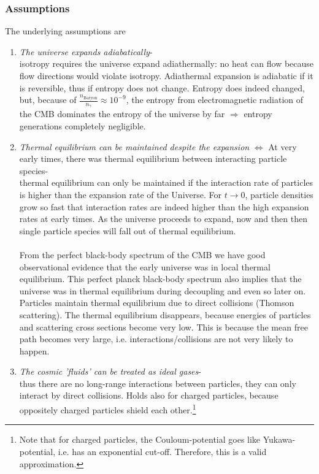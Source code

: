 \subsubsection{Assumptions}
The underlying assumptions are
\begin{enumerate}
\item \emph{The universe expands adiabatically}-\\
isotropy requires the universe expand adiathermally: no heat can flow because flow directions would violate isotropy. Adiathermal expansion is adiabatic if it is reversible, thus if entropy does not change. Entropy does indeed changed, but, because of $\frac{n_{\text{Baryon}}}{n_\gamma} \approx 10^{-9}$, the entropy from electromagnetic radiation of the CMB dominates the entropy of the universe by far $\Rightarrow$ entropy generations completely negligible.
\item \emph{Thermal equilibrium can be maintained despite the expansion} $\Leftrightarrow$ At very early times, there was thermal equilibrium between interacting particle species-\\
thermal equilibrium can only be maintained if the interaction rate of particles is higher than the expansion rate of the Universe. For $t\rightarrow0$, particle densities grow so fast that interaction rates are indeed higher than the high expansion rates at early times. As the universe proceeds to expand, now and then then single particle species will fall out of thermal equilibrium.\\
\\ From the perfect black-body spectrum of the CMB we have good observational evidence that the early universe was in local thermal equilibrium. This perfect planck black-body spectrum also implies that the universe was in thermal equilibrium during decoupling and even so later on. Particles maintain thermal equilibrium due to direct collisions (Thomson scattering). The thermal equilibrium disappears, because energies of particles and scattering cross sections become very low. This is because the mean free path becomes very large, i.e. interactions/collisions are not very likely to happen.
\item \emph{The cosmic ’fluids’ can be treated as ideal gases}- \\
thus there are no long-range interactions between particles, they can only interact by direct collisions. Holds also for charged particles, because oppositely charged particles shield each other.\footnote{Note that for charged particles, the Couloum-potential goes like Yukawa-potential, i.e. has an exponential cut-off. Therefore, this is a valid approximation.}
\end{enumerate}

